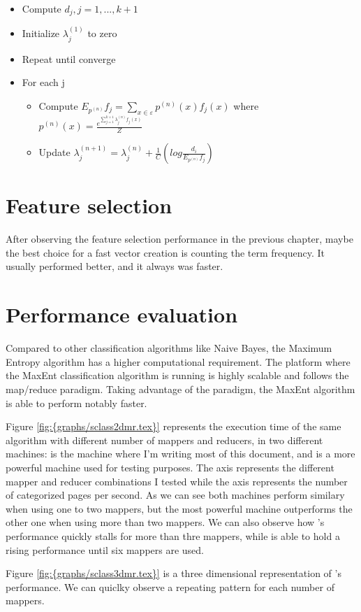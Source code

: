\begin{itemize}
\item Compute $d_j, j=1,...,k+1$
\item Initialize $\lambda_j^{(1)}$ to zero
\item Repeat until converge
\item For each j 
  \begin{itemize}
  \item Compute $E_{p^{(n)}} f_j = \sum\limits_{x \in \varepsilon} p^{(n)} (x)f_j(x)$
    where $p^{(n)}(x) = \frac{e^{\sum\limits_{j=1}^{k+1}\lambda_j^{(n)}f_j(x)}}{Z}$ 
  \item Update $\lambda_j^{(n+1)} = \lambda_j^{(n)} + \frac{1}{C}(log\frac{d_i}{E_{{p^{(n)}}}f_j})$
  \end{itemize}
\end{itemize}

  

\section{Feature selection}
After observing the feature selection performance in the previous chapter, maybe the best choice for a fast vector creation is counting the term frequency. It usually performed better, and it always
was faster.


\section{Performance evaluation}
Compared to other classification algorithms like Naive Bayes, the Maximum Entropy algorithm has a higher computational requirement. 
The platform where the MaxEnt classification algorithm is running is highly scalable and follows the map/reduce paradigm. Taking advantage of the paradigm, the MaxEnt algorithm
is able to perform notably faster.



Figure \ref{fig:{graphs/sclass2dmr.tex}} represents the execution time of the same algorithm with different number of mappers and reducers, in two different machines:  
is the machine where I'm writing most of this document, and  is a more powerful machine used for testing purposes. The  axis represents the 
different mapper and reducer combinations I tested while the  axis represents the number of categorized pages per second.
As we can see both machines perform similary when using one to two mappers, but the most powerful machine outperforms the other one when using more than two mappers. We can also observe how 's performance
quickly stalls for more than thre mappers, while  is able to hold a rising performance until six mappers are used.

Figure \ref{fig:{graphs/sclass3dmr.tex}} is a three dimensional representation of 's performance. We can quiclky observe a repeating pattern for each number of mappers.

